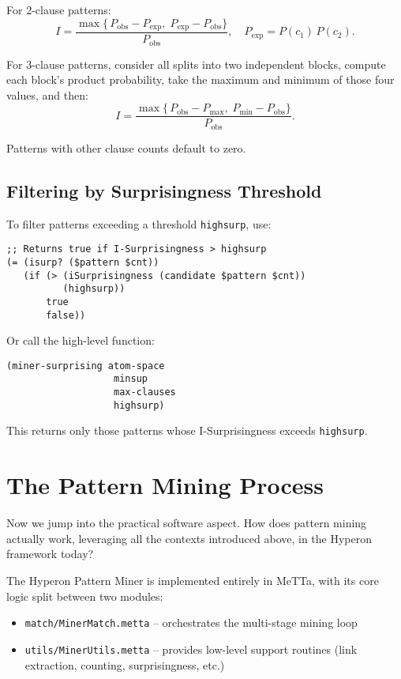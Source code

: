 For 2-clause patterns:
\[
  I = \frac{\max\{\,P_{\mathrm{obs}}-P_{\mathrm{exp}},\;P_{\mathrm{exp}}-P_{\mathrm{obs}}\}}{P_{\mathrm{obs}}},
  \quad
  P_{\mathrm{exp}} = P(c_{1})\,P(c_{2}).
\]

For 3-clause patterns, consider all splits into two independent blocks, compute each block's product probability, take the maximum and minimum of those four values, and then:
\[
  I = \frac{\max\{\,P_{\mathrm{obs}}-P_{\mathrm{max}},\;P_{\mathrm{min}}-P_{\mathrm{obs}}\}}{P_{\mathrm{obs}}}.
\]

Patterns with other clause counts default to zero.

\subsection{Filtering by Surprisingness Threshold}

To filter patterns exceeding a threshold \texttt{highsurp}, use:

\begin{verbatim}
;; Returns true if I-Surprisingness > highsurp
(= (isurp? ($pattern $cnt))
   (if (> (iSurprisingness (candidate $pattern $cnt))
          (highsurp))
       true
       false))
\end{verbatim}

Or call the high-level function:

\begin{verbatim}
(miner-surprising atom-space
                   minsup
                   max-clauses
                   highsurp)
\end{verbatim}

This returns only those patterns whose I-Surprisingness exceeds \texttt{highsurp}.


\section{The Pattern Mining Process}

Now we jump into the practical software aspect.   How does pattern mining actually work, leveraging all the contexts introduced above, in the Hyperon framework today?

The Hyperon Pattern Miner is implemented entirely in MeTTa, with its core logic split between two modules:

\begin{itemize}
  \item \texttt{match/MinerMatch.metta} -- orchestrates the multi-stage mining loop
  \item \texttt{utils/MinerUtils.metta} -- provides low-level support routines (link extraction, counting, surprisingness, etc.)
\end{itemize}

